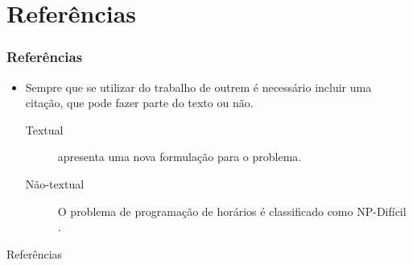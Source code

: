 \documentclass[mathsans,times]{beamer}
\begin{document}
\section{Referências}

\begin{frame}
	\frametitle{Referências}
\begin{itemize}
	\item Sempre que se utilizar do trabalho de outrem é necessário incluir uma citação, que pode fazer parte do texto ou não.
	\begin{description}
		\item [Textual]  apresenta uma nova formulação para o problema. 
		\item [Não-textual] O problema de programação de horários é classificado como NP-Difícil \cite{even1975}.
	\end{description}
\end{itemize}
\end{frame}

\begin{frame}[allowframebreaks]{Referências}
	
\end{frame}
\end{document}
